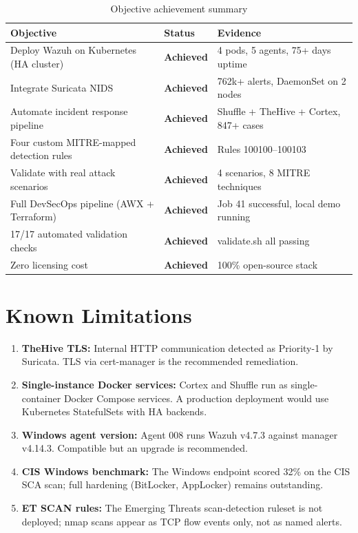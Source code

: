 \documentclass[12pt,a4paper]{report}
\begin{document}
\begin{table}[H]
\centering
\caption{Objective achievement summary}
\begin{tabularx}{\textwidth}{Xll}
\toprule
\textbf{Objective} & \textbf{Status} & \textbf{Evidence} \\
\midrule
Deploy Wazuh on Kubernetes (HA cluster)    & \textcolor{okgreen}{\textbf{Achieved}} & 4 pods, 5 agents, 75+ days uptime \\
Integrate Suricata NIDS                    & \textcolor{okgreen}{\textbf{Achieved}} & 762k+ alerts, DaemonSet on 2 nodes \\
Automate incident response pipeline        & \textcolor{okgreen}{\textbf{Achieved}} & Shuffle + TheHive + Cortex, 847+ cases \\
Four custom MITRE-mapped detection rules   & \textcolor{okgreen}{\textbf{Achieved}} & Rules 100100--100103 \\
Validate with real attack scenarios        & \textcolor{okgreen}{\textbf{Achieved}} & 4 scenarios, 8 MITRE techniques \\
Full DevSecOps pipeline (AWX + Terraform)  & \textcolor{okgreen}{\textbf{Achieved}} & Job 41 successful, local demo running \\
17/17 automated validation checks          & \textcolor{okgreen}{\textbf{Achieved}} & validate.sh all passing \\
Zero licensing cost                        & \textcolor{okgreen}{\textbf{Achieved}} & 100\% open-source stack \\
\bottomrule
\end{tabularx}
\label{tab:objectives}
\end{table}

\section*{Known Limitations}

\begin{enumerate}
  \item \textbf{TheHive TLS:} Internal HTTP communication detected as Priority-1 by Suricata. TLS via cert-manager is the recommended remediation.
  \item \textbf{Single-instance Docker services:} Cortex and Shuffle run as single-container Docker Compose services. A production deployment would use Kubernetes StatefulSets with HA backends.
  \item \textbf{Windows agent version:} Agent 008 runs Wazuh v4.7.3 against manager v4.14.3. Compatible but an upgrade is recommended.
  \item \textbf{CIS Windows benchmark:} The Windows endpoint scored 32\% on the CIS SCA scan; full hardening (BitLocker, AppLocker) remains outstanding.
  \item \textbf{ET SCAN rules:} The Emerging Threats scan-detection ruleset is not deployed; nmap scans appear as TCP flow events only, not as named alerts.
\end{enumerate}
\end{document}

